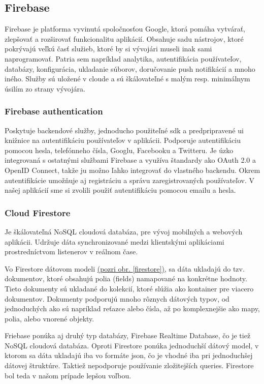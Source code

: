 \subsection{Firebase}
Firebase je platforma vyvinutá spoločnosťou Google, ktorá pomáha vytvárať, zlepšovať a rozširovať funkcionalitu aplikácií. Obsahuje sadu nástrojov, ktoré pokrývajú veľkú časť služieb, ktoré by si vývojári museli inak sami naprogramovať. Patria sem napríklad analytika, autentifikácia používateľov, databázy, konfigurácia, ukladanie súborov, doručovanie push notifikácií a mnoho iného. Služby sú uložené v cloude a sú škálovateľné s malým resp. minimálnym úsilím zo strany vývojára. \cite{firebase} \\

\subsubsection{Firebase authentication}
\label{sec:firebaseauth}
Poskytuje backendové služby, jednoducho použiteľné \acrshort{sdk} a predpripravené \acrshort{ui} knižnice na autentifikáciu používateľov v aplikácii. Podporuje autentifikáciu pomocou hesla, telefónneho čísla, Googlu, Facebooku a Twitteru. Je úzko integrovaná s ostatnými službami Firebase a využíva  štandardy ako OAuth 2.0 a OpenID Connect, takže ju možno ľahko integrovať do vlastného backendu. \cite{auth} Okrem autentifikácie umožňuje aj registráciu a správu zaregistrovaných používateľov. V našej aplikácií sme si zvolili použiť autentifikáciu pomocou emailu a hesla. \\

\subsubsection{Cloud Firestore}
\label{sec:firestore}
Je škálovateľná NoSQL cloudová databáza, pre vývoj mobilných a webových aplikácii. Udržuje dáta synchronizované medzi klientskými aplikáciami prostredníctvom listenerov v reálnom čase.

Vo Firestore dátovom modeli \hyperref[firestore]{(pozri obr. \ref{firestore})}, sa dáta ukladajú do tzv. dokumentov, ktoré obsahujú polia (fields) namapované na konkrétne hodnoty. Tieto dokumenty sú ukladané do kolekcií, ktoré slúžia ako kontainer pre viacero dokumentov. Dokumenty podporujú mnoho rôznych dátových typov, od jednoduchých ako sú napríklad reťazce alebo čísla, až po komplexnejšie ako mapy, polia, alebo vnorené objekty. \cite{firestoredoc}

Friebase ponúka aj druhý typ databázy, Firebase Realtime Database, čo je tiež NoSQL cloudová databáza. Oproti Firestore ponúka jednoduchší dátový model, v ktorom sa dáta ukladajú iba vo formáte \acrshort{json}, čo je vhodné iba pri jednoduchšej dátovej štruktúre. Taktiež nepodporuje používanie zložitejších queries. Firestore bol teda v našom prípade lepšou voľbou. \\

